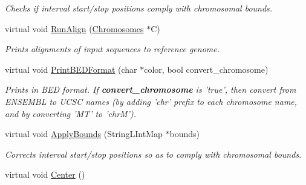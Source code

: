 \begin{CompactItemize}
\begin{CompactList}\small\item\em Checks if interval start/stop positions comply with chromosomal bounds. \item\end{CompactList}\item 
\hypertarget{classGenomicRegion_90b0382a60f0a8532af73fc18f41364b}{
virtual void \hyperlink{classGenomicRegion_90b0382a60f0a8532af73fc18f41364b}{RunAlign} (\hyperlink{classChromosomes}{Chromosomes} $\ast$C)}
\label{classGenomicRegion_90b0382a60f0a8532af73fc18f41364b}

\begin{CompactList}\small\item\em Prints alignments of input sequences to reference genome. \item\end{CompactList}\item 
\hypertarget{classGenomicRegion_405010d9256a3c08c53adee98133cb62}{
virtual void \hyperlink{classGenomicRegion_405010d9256a3c08c53adee98133cb62}{PrintBEDFormat} (char $\ast$color, bool convert\_\-chromosome)}
\label{classGenomicRegion_405010d9256a3c08c53adee98133cb62}

\begin{CompactList}\small\item\em Prints in BED format. If {\bf convert\_\-chromosome} is 'true', then convert from ENSEMBL to UCSC names (by adding 'chr' prefix to each chromosome name, and by converting 'MT' to 'chrM'). \item\end{CompactList}\item 
\hypertarget{classGenomicRegion_71367cf4a117918f43a71a5295839733}{
virtual void \hyperlink{classGenomicRegion_71367cf4a117918f43a71a5295839733}{ApplyBounds} (StringLIntMap $\ast$bounds)}
\label{classGenomicRegion_71367cf4a117918f43a71a5295839733}

\begin{CompactList}\small\item\em Corrects interval start/stop positions so as to comply with chromosomal bounds. \item\end{CompactList}\item 
\hypertarget{classGenomicRegion_1e9a85a086afbe2608411450c9a4c5e6}{
virtual void \hyperlink{classGenomicRegion_1e9a85a086afbe2608411450c9a4c5e6}{Center} ()}
\label{classGenomicRegion_1e9a85a086afbe2608411450c9a4c5e6}


\end{CompactItemize}
